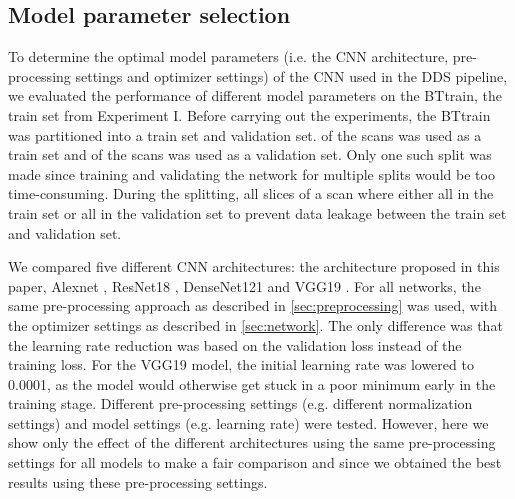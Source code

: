 \clearpage
\begin{subappendices}
\section{Model parameter selection}
\label{app:crossval}

To determine the optimal model parameters (i.e. the \gls{CNN} architecture, pre-processing settings and optimizer settings) of the \gls{CNN} used in the \gls{DDS} pipeline, we evaluated the performance of different model parameters on the \gls{BTtrain}, the train set from Experiment I.
Before carrying out the experiments, the \gls{BTtrain} was partitioned into a train set and validation set.
 of the \glspl{scan} was used as a train set and  of the \glspl{scan} was used as a validation set.
Only one such split was made since training and validating the network for multiple splits would be too time-consuming.
During the splitting, all \glspl{slice} of a \gls{scan} where either all in the train set or all in the validation set to prevent data leakage between the train set and validation set.

We compared five different \gls{CNN} architectures: the architecture proposed in this paper, Alexnet \autocite{krizhevsky2012imagenet}, ResNet18 \autocite{he2016deep}, DenseNet121 \autocite{huang2017densely} and VGG19 \autocite{simonyan2014very}.
For all networks, the same pre-processing approach as described in \cref{sec:preprocessing} was used, with the optimizer settings as described in \cref{sec:network}.
The only difference was that the learning rate reduction was based on the validation loss instead of the training loss.
For the VGG19 model, the initial learning rate was lowered to 0.0001, as the model would otherwise get stuck in a poor minimum early in the training stage.
Different pre-processing settings (e.g. different normalization settings) and model settings (e.g. learning rate) were tested.
However, here we show only the effect of the different architectures using the same pre-processing settings for all models to make a fair comparison and since we obtained the best results using these pre-processing settings.


\end{subappendices}
